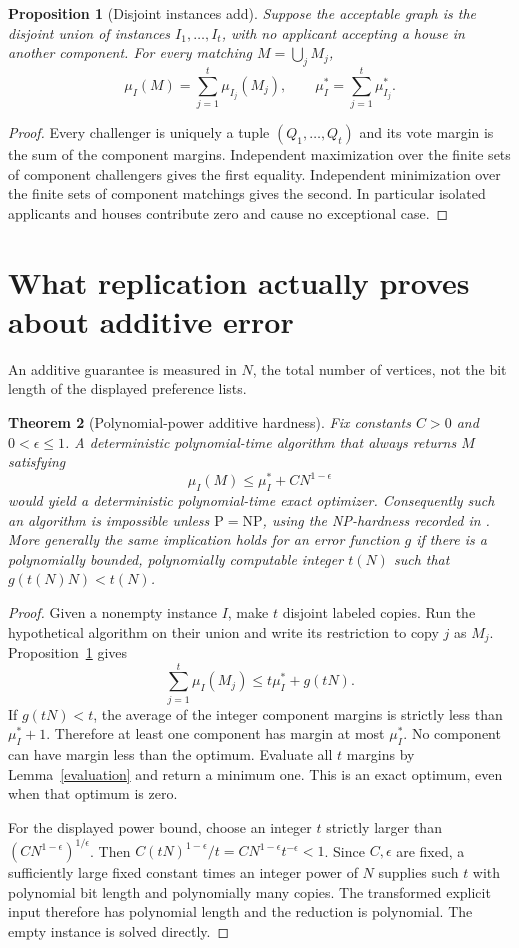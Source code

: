 \documentclass[11pt]{article}
\newtheorem{theorem}{Theorem}
\newtheorem{proposition}[theorem]{Proposition}
\theoremstyle{remark}
\begin{document}
\begin{proposition}[Disjoint instances add]\label{sum}
Suppose the acceptable graph is the disjoint union of instances
$I_1,\ldots,I_t$, with no applicant accepting a house in another
component. For every matching $M=\bigcup_jM_j$,
\[
 \mu_I(M)=\sum_{j=1}^t\mu_{I_j}(M_j),\qquad
 \mu_I^*=\sum_{j=1}^t\mu_{I_j}^*.
\]
\end{proposition}
\begin{proof}
Every challenger is uniquely a tuple $(Q_1,\ldots,Q_t)$ and its vote
margin is the sum of the component margins. Independent maximization
over the finite sets of component challengers gives the first equality.
Independent minimization over the finite sets of component matchings
gives the second. In particular isolated applicants and houses contribute
zero and cause no exceptional case.
\end{proof}

\section{What replication actually proves about additive error}
An additive guarantee is measured in $N$, the total number of vertices,
not the bit length of the displayed preference lists.

\begin{theorem}[Polynomial-power additive hardness]\label{hardness}
Fix constants $C>0$ and $0<\epsilon\leq1$. A deterministic polynomial-time
algorithm that always returns $M$ satisfying
\[
 \mu_I(M)\leq\mu_I^*+C N^{1-\epsilon}
\]
would yield a deterministic polynomial-time exact optimizer. Consequently
such an algorithm is impossible unless $\mathrm P=\mathrm{NP}$, using
the NP-hardness recorded in \cite[Theorem 3]{survey}.
More generally the same implication holds for an error function $g$ if
there is a polynomially bounded, polynomially computable integer $t(N)$
such that $g(t(N)N)<t(N)$.
\end{theorem}
\begin{proof}
Given a nonempty instance $I$, make $t$ disjoint labeled copies. Run the
hypothetical algorithm on their union and write its restriction to copy
$j$ as $M_j$. Proposition~\ref{sum} gives
\[
 \sum_{j=1}^t\mu_I(M_j)\leq t\mu_I^*+g(tN).
\]
If $g(tN)<t$, the average of the integer component margins is strictly
less than $\mu_I^*+1$. Therefore at least one component has margin at most
$\mu_I^*$. No component can have margin less than the optimum. Evaluate
all $t$ margins by Lemma~\ref{evaluation} and return a minimum one.
This is an exact optimum, even when that optimum is zero.

For the displayed power bound, choose an integer $t$ strictly larger
than $(C N^{1-\epsilon})^{1/\epsilon}$. Then
$C(tN)^{1-\epsilon}/t=C N^{1-\epsilon}t^{-\epsilon}<1$.
Since $C,\epsilon$ are fixed, a sufficiently large fixed constant times
an integer power of $N$ supplies such $t$ with polynomial bit length
and polynomially many copies. The transformed explicit input therefore
has polynomial length and the reduction is polynomial. The empty
instance is solved directly.
\end{proof}
\end{document}
